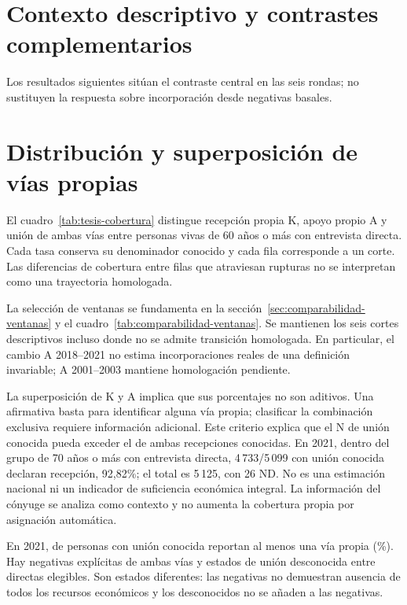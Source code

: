 \FloatBarrier
\section*{Contexto descriptivo y contrastes complementarios}
Los resultados siguientes sitúan el contraste central en las seis rondas;
no sustituyen la respuesta sobre incorporación desde negativas basales.

\section{Distribución y superposición de vías propias}
\label{sec:resultados-cobertura}

El cuadro~\ref{tab:tesis-cobertura} distingue recepción propia K, apoyo
propio A y unión de ambas vías entre personas vivas de 60 años o más con
entrevista directa. Cada tasa conserva su denominador conocido y cada
fila corresponde a un corte. Las diferencias de cobertura entre filas que
atraviesan rupturas no se interpretan como una trayectoria homologada.

La selección de ventanas se fundamenta en la
sección~\ref{sec:comparabilidad-ventanas} y el
cuadro~\ref{tab:comparabilidad-ventanas}. Se mantienen los seis cortes
descriptivos incluso donde no se admite transición homologada.
En particular, el cambio A 2018--2021 no estima incorporaciones reales
de una definición invariable; A 2001--2003 mantiene homologación pendiente.


\FloatBarrier

La superposición de K y A implica que sus porcentajes no son aditivos.
Una afirmativa basta para identificar alguna vía propia; clasificar la
combinación exclusiva requiere información adicional. Este criterio explica
que el N de unión conocida pueda exceder el de ambas recepciones conocidas.
En 2021, dentro del grupo de 70 años o más con entrevista directa,
4\,733/5\,099 con unión conocida declaran recepción, 92{,}82\%; el total
es 5\,125, con 26 ND. No es una estimación nacional ni un indicador de
suficiencia económica integral. La información del cónyuge se analiza como contexto y no aumenta la cobertura
propia por asignación automática.

En 2021,  de  personas con unión
conocida reportan al menos una vía propia (\%).
Hay  negativas explícitas de ambas vías y
 estados de unión desconocida entre
 directas elegibles. Son estados diferentes:
las negativas no demuestran ausencia de todos los recursos económicos
y los desconocidos no se añaden a las negativas.

